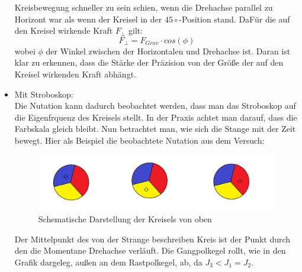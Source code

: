 \begin{itemize}
        Kreisbewegung schneller zu sein schien, wenn die Drehachse parallel zu Horizont war als wenn der Kreisel in der $45\circ$-Position stand. DaFür die auf den 
        Kreisel wirkende Kraft $F_{\bot}$ gilt:
    \begin{equation*}
        F_{\bot} = F_{Grav} \cdot cos(\phi)
    \end{equation*}
    wobei $\phi$ der Winkel zwischen der Horizontalen und Drehachse ist.
    Daran ist klar zu erkennen, dass die Stärke der Präzision von der Größe der auf den Kreisel wirkenden Kraft abhängt.
    \item Mit Stroboskop:\\
        Die Nutation kann dadurch beobachtet werden, dass man das Stroboskop auf die Eigenfrquenz des Kreisels stellt. In der Praxis achtet man darauf, dass die Farbskala gleich bleibt. Nun betrachtet man, wie sich 
        die Stange mit der Zeit bewegt. Hier als Beispiel die beobachtete Nutation aus dem Versuch:\\
        \begin{figure}[h]
            \centering
            \includegraphics[width = 13cm]{Bilder/Leo/Nutationfarben.png}
            \caption{Schematische Darstellung der Kreisels von oben}
        \end{figure}
       Der Mittelpunkt des von der Strange beschreiben Kreis ist der Punkt durch den die Momentane Drehachse verläuft.
       Die Gangpolkegel rollt, wie in den Grafik %
        dargeleg, außen an dem Rastpolkegel, ab, da $J_3 < J_1 = J_2$.

\end{itemize}

